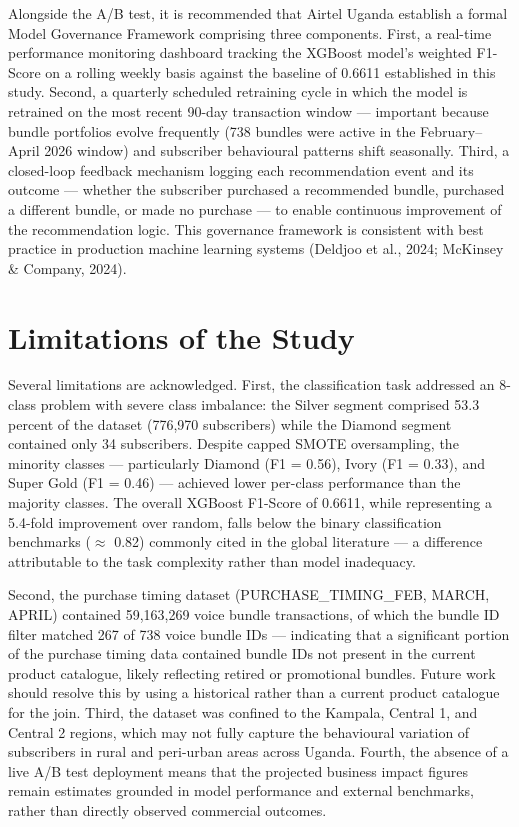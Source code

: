 Alongside the A/B test, it is recommended that Airtel Uganda establish a formal Model Governance Framework comprising three components. First, a real-time performance monitoring dashboard tracking the XGBoost model's weighted F1-Score on a rolling weekly basis against the baseline of 0.6611 established in this study. Second, a quarterly scheduled retraining cycle in which the model is retrained on the most recent 90-day transaction window --- important because bundle portfolios evolve frequently (738 bundles were active in the February--April 2026 window) and subscriber behavioural patterns shift seasonally. Third, a closed-loop feedback mechanism logging each recommendation event and its outcome --- whether the subscriber purchased a recommended bundle, purchased a different bundle, or made no purchase --- to enable continuous improvement of the recommendation logic. This governance framework is consistent with best practice in production machine learning systems (Deldjoo et al., 2024; McKinsey \& Company, 2024).


\section{Limitations of the Study}

Several limitations are acknowledged. First, the classification task addressed an 8-class problem with severe class imbalance: the Silver segment comprised 53.3 percent of the dataset (776,970 subscribers) while the Diamond segment contained only 34 subscribers. Despite capped SMOTE oversampling, the minority classes --- particularly Diamond (F1 = 0.56), Ivory (F1 = 0.33), and Super Gold (F1 = 0.46) --- achieved lower per-class performance than the majority classes. The overall XGBoost F1-Score of 0.6611, while representing a 5.4-fold improvement over random, falls below the binary classification benchmarks ($\approx$ 0.82) commonly cited in the global literature --- a difference attributable to the task complexity rather than model inadequacy.

Second, the purchase timing dataset (PURCHASE\_TIMING\_FEB, MARCH, APRIL) contained 59,163,269 voice bundle transactions, of which the bundle ID filter matched 267 of 738 voice bundle IDs --- indicating that a significant portion of the purchase timing data contained bundle IDs not present in the current product catalogue, likely reflecting retired or promotional bundles. Future work should resolve this by using a historical rather than a current product catalogue for the join. Third, the dataset was confined to the Kampala, Central 1, and Central 2 regions, which may not fully capture the behavioural variation of subscribers in rural and peri-urban areas across Uganda. Fourth, the absence of a live A/B test deployment means that the projected business impact figures remain estimates grounded in model performance and external benchmarks, rather than directly observed commercial outcomes.


